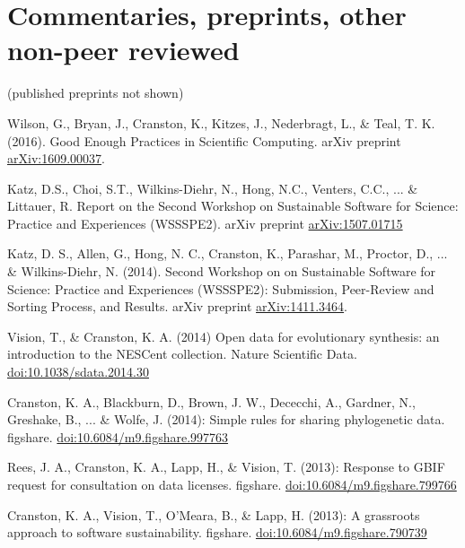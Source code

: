 \documentclass[10pt]{article}
\begin{document}
\section*{Commentaries, preprints, other non-peer reviewed}

(published preprints not shown)

Wilson, G., Bryan, J., Cranston, K., Kitzes, J., Nederbragt, L., \& Teal, T. K. (2016). Good Enough Practices in Scientific Computing. arXiv preprint \href{http://arxiv.org/abs/1609.00037}{arXiv:1609.00037}.

Katz, D.S., Choi, S.T., Wilkins-Diehr, N., Hong, N.C., Venters, C.C., ... \& Littauer, R. Report on the Second Workshop on Sustainable Software for Science: Practice and Experiences (WSSSPE2). arXiv preprint \href{http://arxiv.org/abs/1507.01715}{arXiv:1507.01715}

Katz, D. S., Allen, G., Hong, N. C., Cranston, K., Parashar, M., Proctor, D., ... \& Wilkins-Diehr, N. (2014). Second Workshop on on Sustainable Software for Science: Practice and Experiences (WSSSPE2): Submission, Peer-Review and Sorting Process, and Results. arXiv preprint \href{http://arxiv.org/abs/1411.3464}{arXiv:1411.3464}.

Vision, T., \& Cranston, K. A. (2014) Open data for evolutionary synthesis: an introduction to the NESCent collection. Nature Scientific Data. \href{http://dx.doi.org/10.1038/sdata.2014.30}{doi:10.1038/sdata.2014.30}

Cranston, K. A., Blackburn, D., Brown, J. W., Dececchi, A., Gardner, N., Greshake, B., ... \& Wolfe, J. (2014): Simple rules for sharing phylogenetic data. figshare. \href{http://dx.doi.org/10.6084/m9.figshare.997763}{doi:10.6084/m9.figshare.997763}

Rees, J. A., Cranston, K. A., Lapp, H., \& Vision, T. (2013): Response to GBIF request for consultation on data licenses. figshare. \href{http://dx.doi.org/10.6084/m9.figshare.799766}{doi:10.6084/m9.figshare.799766}

Cranston, K. A., Vision, T., O'Meara, B., \& Lapp, H. (2013): A grassroots approach to software sustainability. figshare.
\href{http://dx.doi.org/10.6084/m9.figshare.790739}{doi:10.6084/m9.figshare.790739}

\end{document}
